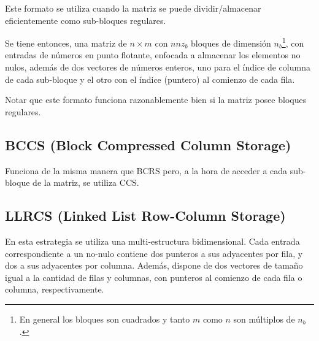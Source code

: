 Este formato se utiliza cuando la matriz se puede dividir/almacenar eficientemente como sub-bloques regulares.

Se tiene entonces, una matriz de $n \times m$ con $nnz_b$ bloques de dimensión $n_b$\footnote{En general los bloques son cuadrados y tanto $m$ como $n$ son múltiplos de $n_b$.}, con entradas de números en punto flotante, enfocada a almacenar los elementos no nulos, además de dos vectores de números enteros, uno para el índice de columna de cada sub-bloque y el otro con el índice (puntero) al comienzo de cada fila.

Notar que este formato funciona razonablemente bien si la matriz posee bloques regulares.

\subsection{BCCS (Block Compressed Column Storage)}\label{bccs}

Funciona de la misma manera que BCRS pero, a la hora de acceder a cada sub-bloque de la matriz, se utiliza CCS.




\subsection{LLRCS (Linked List Row-Column Storage)}

En esta estrategia se utiliza una multi-estructura bidimensional. 
Cada entrada correspondiente a un no-nulo contiene dos punteros a sus adyacentes por
fila, y dos a sus adyacentes por columna. Además, dispone de dos vectores de tamaño igual a la cantidad de filas y columnas,  
con punteros al comienzo de cada fila o columna, respectivamente.

